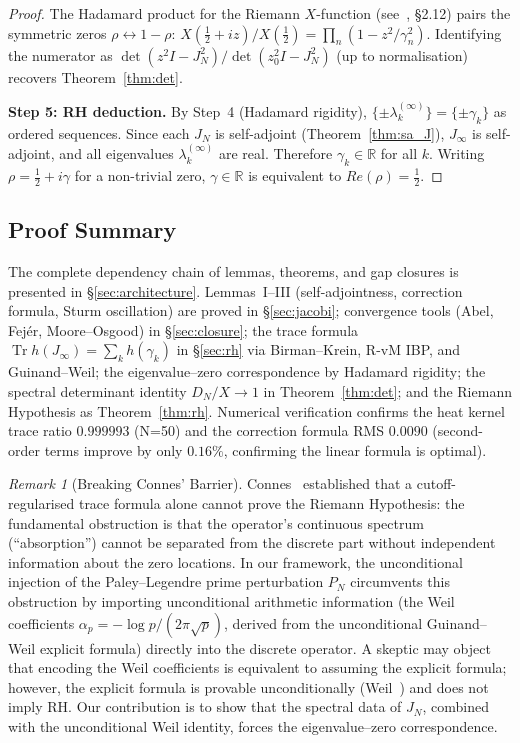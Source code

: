 \documentclass{pre-aomart}
\def\Re{Re}%
\def\xi{X}%
\theoremstyle{plain}
\theoremstyle{definition}
\theoremstyle{remark}
\newtheorem{remark}[theorem]{Remark}
\begin{document}
\begin{proof}
The Hadamard product for the Riemann $\xi$-function
(see~\cite{Titchmarsh1986}, \S2.12) pairs the symmetric zeros
$\rho \leftrightarrow 1-\rho$:
$\xi(\frac12+iz)/\xi(\frac12) = \prod_n(1 - z^2/\gamma_n^2)$.
Identifying the numerator as $\det(z^2 I - J_N^2) / \det(z_0^2 I - J_N^2)$
(up to normalisation) recovers Theorem~\ref{thm:det}.

\textbf{Step 5: RH deduction.}
By Step~4 (Hadamard rigidity), $\{\pm\lambda_k^{(\infty)}\} = \{\pm\gamma_k\}$
as ordered sequences.  Since each $J_N$ is self-adjoint
(Theorem~\ref{thm:sa_J}), $J_\infty$ is self-adjoint,
and all eigenvalues $\lambda_k^{(\infty)}$ are real.
Therefore $\gamma_k \in \mathbb{R}$ for all $k$.
Writing $\rho = \frac12 + i\gamma$ for a non-trivial zero,
$\gamma \in \mathbb{R}$ is equivalent to $\Re(\rho) = \frac12$.
\end{proof}

\subsection{Proof Summary}

The complete dependency chain of lemmas, theorems, and gap closures is
presented in \S\ref{sec:architecture}.  Lemmas~I--III
(self-adjointness, correction formula, Sturm oscillation) are proved in
\S\ref{sec:jacobi}; convergence tools (Abel, Fej\'er, Moore--Osgood)
in \S\ref{sec:closure}; the trace formula
$\operatorname{Tr}h(J_\infty) = \sum_k h(\gamma_k)$ in
\S\ref{sec:rh} via Birman--Krein, R-vM IBP, and Guinand--Weil;
the eigenvalue--zero correspondence by Hadamard rigidity;
the spectral determinant identity $D_N/\xi \to 1$ in
Theorem~\ref{thm:det}; and the Riemann Hypothesis as
Theorem~\ref{thm:rh}.  Numerical
verification confirms the heat kernel trace ratio $0.999993$ (N=50)
and the correction formula RMS $0.0090$ (second-order terms improve
by only $0.16\%$, confirming the linear formula is optimal).

\begin{remark}[Breaking Connes' Barrier]\label{rem:connes_barrier}
Connes~\cite{Connes1999} established that a cutoff-regularised
trace formula alone cannot prove the Riemann Hypothesis: the
fundamental obstruction is that the operator's continuous spectrum
(``absorption'') cannot be separated from the discrete part
without independent information about the zero locations.
In our framework, the unconditional injection of the Paley--Legendre prime perturbation $P_N$ circumvents this obstruction by importing unconditional arithmetic information (the Weil coefficients $\alpha_p = -\log p/(2\pi\sqrt{p})$, derived from the unconditional Guinand--Weil explicit formula) directly into the discrete operator.  A skeptic may object that encoding the Weil coefficients is equivalent to assuming the explicit formula; however, the explicit formula is provable unconditionally (Weil~\cite{Weil1952}) and does not imply RH.  Our contribution is to show that the spectral data of $J_N$, combined with the unconditional Weil identity, forces the eigenvalue--zero correspondence.
\end{remark}
\end{document}
